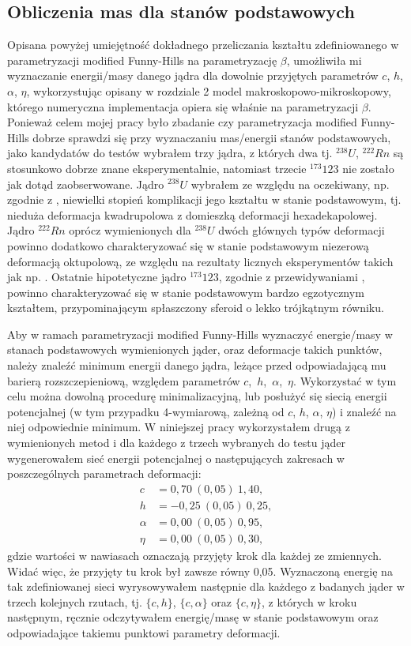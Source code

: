 \documentclass[a4paper,polish]{article}
\numberwithin{equation}{section}
\begin{document}
\clearpage
\subsection{Obliczenia mas dla stanów podstawowych}

Opisana powyżej umiejętność dokładnego przeliczania kształtu zdefiniowanego w parametryzacji modified Funny-Hills na parametryzację $\beta$, umożliwiła mi wyznaczanie energii/masy danego jądra dla dowolnie przyjętych parametrów $c$, $h$, $\alpha$, $\eta$, wykorzystując opisany w rozdziale 2 model makroskopowo-mikroskopowy, którego numeryczna implementacja opiera się właśnie na parametryzacji $\beta$. Ponieważ celem mojej pracy było zbadanie czy parametryzacja modified Funny-Hills dobrze sprawdzi się przy wyznaczaniu mas/energii stanów podstawowych, jako kandydatów do testów wybrałem trzy jądra, z których dwa tj. $^{238}U$, $^{222}Rn$ są stosunkowo dobrze znane eksperymentalnie, natomiast trzecie $^{173}123$ nie zostało jak dotąd zaobserwowane. Jądro $^{238}U$ wybrałem ze względu na oczekiwany, np. zgodnie z \cite{RIPL3}, niewielki stopień komplikacji jego kształtu w stanie podstawowym, tj. nieduża deformacja kwadrupolowa z domieszką deformacji hexadekapolowej. Jądro $^{222}Rn$ oprócz wymienionych dla $^{238}U$ dwóch głównych typów deformacji powinno dodatkowo charakteryzować się w stanie podstawowym niezerową deformacją oktupolową, ze względu na rezultaty licznych eksperymentów takich jak np. \cite{E3}. Ostatnie hipotetyczne jądro $^{173}123$, zgodnie z przewidywaniami \cite{A32}, powinno charakteryzować się w stanie podstawowym bardzo egzotycznym kształtem, przypominającym spłaszczony sferoid o lekko trójkątnym równiku. 

Aby w ramach parametryzacji modified Funny-Hills wyznaczyć energie/masy w stanach podstawowych wymienionych jąder, oraz deformacje takich punktów, należy znaleźć minimum energii danego jądra, leżące przed odpowiadającą mu barierą rozszczepieniową, względem parametrów $c$,~$h$,~$\alpha$,~$\eta$. Wykorzystać w tym celu można dowolną procedurę minimalizacyjną, lub posłużyć się siecią energii potencjalnej (w tym przypadku 4-wymiarową, zależną od $c$, $h$, $\alpha$, $\eta$) i znaleźć na niej odpowiednie minimum. W niniejszej pracy wykorzystałem drugą z wymienionych metod i dla każdego z trzech wybranych do testu jąder wygenerowałem sieć energii potencjalnej o następujących zakresach w poszczególnych parametrach deformacji:
\begin{align*}
c&=0,70~(0,05)~1,40,\\
h&=-0,25~(0,05)~0,25,\\
\alpha&=0,00~(0,05)~0,95,\\
\eta&=0,00~(0,05)~0,30,
\end{align*}
gdzie wartości w nawiasach oznaczają przyjęty krok dla każdej ze zmiennych. Widać więc, że przyjęty tu krok był zawsze równy 0,05. Wyznaczoną energię na tak zdefiniowanej sieci wyrysowywałem następnie dla każdego z badanych jąder w trzech kolejnych rzutach, tj. $\{c,h\}$, $\{c,\alpha\}$ oraz $\{c,\eta\}$, z których w kroku następnym, ręcznie odczytywałem energię/masę w stanie podstawowym oraz odpowiadające takiemu punktowi parametry deformacji.
\end{document}
